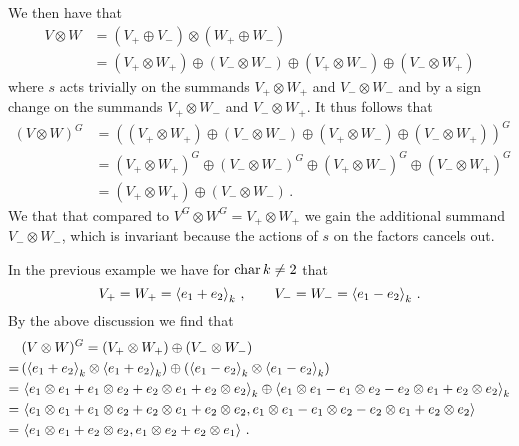 \begin{remark}
  We then have that
  \begin{align*}
        V \otimes W
    &=  (V_+ \oplus V_-) \otimes (W_+ \oplus W_-) \\
    &=  (V_+ \otimes W_+) \oplus (V_- \otimes W_-) \oplus (V_+ \otimes W_-) \oplus (V_- \otimes W_+)
  \end{align*}
  where $s$ acts trivially on the summands $V_+ \otimes W_+$ and $V_- \otimes W_-$ and by a sign change on the summands $V_+ \otimes W_-$ and $V_- \otimes W_+$.
  It thus follows that
  \begin{align*}
        (V \otimes W)^G
    &=  \left(
                  (V_+ \otimes W_+)
          \oplus  (V_- \otimes W_-)
          \oplus  (V_+ \otimes W_-)
          \oplus  (V_- \otimes W_+)
        \right)^G \\
    &=  (V_+ \otimes W_+)^G \oplus (V_- \otimes W_-)^G \oplus (V_+ \otimes W_-)^G \oplus (V_- \otimes W_+)^G  \\
    &=  (V_+ \otimes W_+) \oplus (V_- \otimes W_-) \,.
  \end{align*}
  We that that compared to $V^G \otimes W^G = V_+ \otimes W_+$ we gain the additional summand $V_- \otimes W_-$, which is invariant because the actions of $s$ on the factors cancels out.
  
  In the previous example we have for $\operatorname{char} k \neq 2$ that
  \[
    V_+ = W_+ = \left\langle  e_1 + e_2  \right\rangle_k \,,
    \qquad
    V_- = W_- = \left\langle  e_1 - e_2  \right\rangle_k \,.
  \]
  By the above discussion we find that
  \begin{align*}
     &\,  (V \otimes W)^G
    =     (V_+ \otimes W_+) \oplus (V_- \otimes W_-)  \\
    =&\,  (\left\langle e_1 + e_2 \right\rangle_k \otimes \left\langle e_1 + e_2 \right\rangle_k) \oplus (\left\langle e_1 - e_2 \right\rangle_k \otimes \left\langle e_1 - e_2 \right\rangle_k)  \\
    =&\,          \left\langle e_1 \otimes e_1 + e_1 \otimes e_2 + e_2 \otimes e_1 + e_2 \otimes e_2 \right\rangle_k
          \oplus  \left\langle e_1 \otimes e_1 - e_1 \otimes e_2 - e_2 \otimes e_1 + e_2 \otimes e_2 \right\rangle_k \\
    =&\,  \left\langle 
            e_1 \otimes e_1 + e_1 \otimes e_2 + e_2 \otimes e_1 + e_2 \otimes e_2,
            e_1 \otimes e_1 - e_1 \otimes e_2 - e_2 \otimes e_1 + e_2 \otimes e_2
           \right\rangle \\
    =&\,  \left\langle e_1 \otimes e_1 + e_2 \otimes e_2, e_1 \otimes e_2 + e_2 \otimes e_1 \right\rangle \,.
  \end{align*}
\end{remark}





